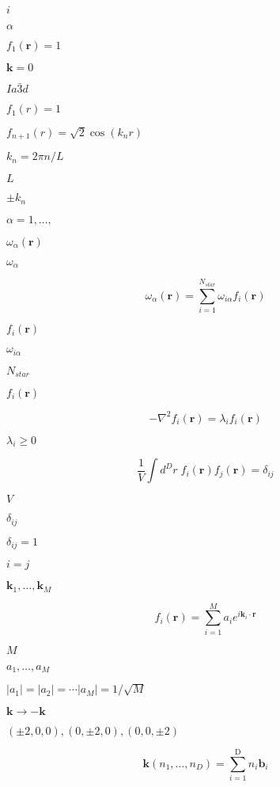 \documentclass{article}
\begin{document}
$i$
\pagebreak

$\alpha$
\pagebreak

$f_{1}(\textbf{r}) = 1$
\pagebreak

$\textbf{k} = 0$
\pagebreak

$Ia\bar{3}d$
\pagebreak

$f_{1}(r)=1$
\pagebreak

$f_{n+1}(r) = \sqrt{2}\cos(k_{n}r)$
\pagebreak

$k_{n} = 2\pi n/L$
\pagebreak

$L$
\pagebreak

$\pm k_{n}$
\pagebreak

$\alpha = 1, \ldots,$
\pagebreak

$\omega_{\alpha}(\textbf{r})$
\pagebreak

$\omega_{\alpha}$
\pagebreak

\[ \omega_{\alpha}(\textbf{r}) = \sum_{i=1}^{N_{star}} \omega_{i\alpha} f_{i}(\textbf{r}) \]
\pagebreak

$ f_{i}(\textbf{r})$
\pagebreak

$\omega_{i\alpha}$
\pagebreak

$N_{star}$
\pagebreak

$f_{i}(\textbf{r})$
\pagebreak

\[ -\nabla^{2}f_{i}(\textbf{r}) = \lambda_{i} f_{i}(\textbf{r}) \]
\pagebreak

$\lambda_{i} \geq 0$
\pagebreak

\[ \frac{1}{V} \int \! d^{D}r \; f_{i}(\textbf{r}) f_{j}(\textbf{r}) = \delta_{ij} \]
\pagebreak

$V$
\pagebreak

$\delta_{ij}$
\pagebreak

$\delta_{ij} = 1$
\pagebreak

$i=j$
\pagebreak

$\textbf{k}_{1}, \ldots, \textbf{k}_{M}$
\pagebreak

\[ f_{i}(\textbf{r}) = \sum_{i=1}^{M} a_{i} e^{i\textbf{k}_{i} \cdot \textbf{r}} \]
\pagebreak

$M$
\pagebreak

$a_{1}, \ldots ,a_{M}$
\pagebreak

$|a_{1}| = |a_{2}| = \cdots |a_{M}| = 1/\sqrt{M}$
\pagebreak

$\textbf{k} \rightarrow - \textbf{k}$
\pagebreak

$(\pm2,0,0), (0,\pm 2, 0), (0, 0, \pm 2)$
\pagebreak

\[ \textbf{k}(n_1, \ldots, n_{D}) = \sum_{i=1}^{\textrm{D}} n_{i}\textbf{b}_{i} \]
\pagebreak
\end{document}

